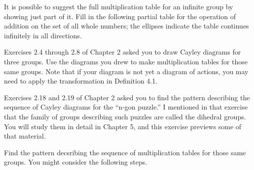 \begin{questions}

	\question It is possible to suggest the full multiplication table for an infinite group by showing just part of it. Fill in the following partial table for the operation of addition on the set of all whole numbers; the ellipses indicate the table continues infinitely in all directions.

	\question Exercises 2.4 through 2.8 of Chapter 2 asked you to draw Cayley diagrams for three groups. Use the diagrams you drew to make multiplication tables for those same groups. Note that if your diagram is not yet a diagram of actions, you may need to apply the transformation in Definition 4.1.
	
	\question Exercises 2.18 and 2.19 of Chapter 2 asked you to find the pattern describing the sequence of Cayley diagrams for the ``n-gon puzzle.'' I mentioned in that exercise that the family of groups describing such puzzles are called the dihedral groups. You will study them in detail in Chapter 5, and this exercise previews some of that material.
	\par Find the pattern decsribing the sequence of multiplication tables for those same groups. You might consider the following steps.
	\begin{parts}

\end{parts}
\end{questions}
